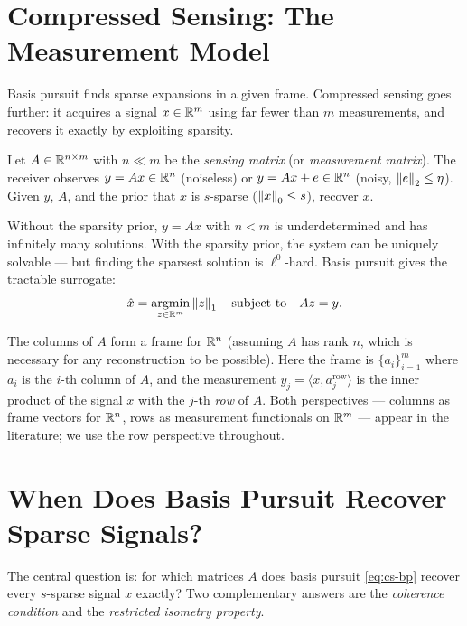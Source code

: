 \section{Compressed Sensing: The Measurement Model}
\label{sec:cs-model}

Basis pursuit finds sparse expansions in a given frame. Compressed
sensing goes further: it acquires a signal $x\in\mathbb{R}^m$ using far fewer
than $m$ measurements, and recovers it exactly by exploiting sparsity.

\begin{definition}
\label{def:cs-model}
Let $A\in\mathbb{R}^{n\times m}$ with $n\ll m$ be the \emph{sensing matrix}
(or \emph{measurement matrix}). The receiver observes $y = Ax\in\mathbb{R}^n$
(noiseless) or $y = Ax + e\in\mathbb{R}^n$ (noisy, $\left\| e \right\|_2\le\eta$).
Given $y$, $A$, and the prior that $x$ is $s$-sparse ($\left\| x \right\|_0\le s$),
recover $x$.
\end{definition}

Without the sparsity prior, $y=Ax$ with $n<m$ is underdetermined and
has infinitely many solutions. With the sparsity prior, the system
can be uniquely solvable --- but finding the sparsest solution is
$\ell^0$-hard. Basis pursuit gives the tractable surrogate:
\begin{equation}
\label{eq:cs-bp}
  \hat x = \operatorname*{argmin}_{z\in\mathbb{R}^m}\left\| z \right\|_1 \quad
  \text{subject to}\quad Az = y.
\end{equation}

\begin{remark*}
The columns of $A$ form a frame for $\mathbb{R}^n$ (assuming $A$ has rank $n$,
which is necessary for any reconstruction to be possible). Here the
frame is $\{a_i\}_{i=1}^m$ where $a_i$ is the $i$-th column of $A$,
and the measurement $y_j = \langle x, a_j^{\text{row}}\rangle$ is the
inner product of the signal $x$ with the $j$-th \emph{row} of $A$.
Both perspectives --- columns as frame vectors for $\mathbb{R}^n$, rows as
measurement functionals on $\mathbb{R}^m$ --- appear in the literature; we use
the row perspective throughout.
\end{remark*}

\section{When Does Basis Pursuit Recover Sparse Signals?}
\label{sec:recovery-conditions}

The central question is: for which matrices $A$ does basis pursuit
\eqref{eq:cs-bp} recover every $s$-sparse signal $x$ exactly?
Two complementary answers are the \emph{coherence condition} and the
\emph{restricted isometry property}.

